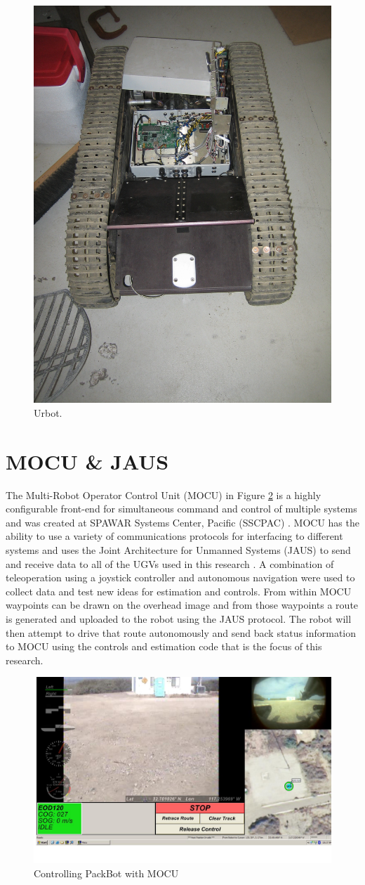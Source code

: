 \begin{figure}[ht!]
	\centering
	\includegraphics[width=.3\textwidth]{images/urbot}
	\caption{Urbot.}
	\label{fig:urbot}
\end{figure}

\section{MOCU \& JAUS}
\label{sec:mocujaus}
The Multi-Robot Operator Control Unit (MOCU) in Figure \ref{fig:mocu} is a highly configurable front-end for simultaneous command and control of multiple systems and was created at SPAWAR Systems Center, Pacific (SSCPAC) \cite{PowellMOCU08}. MOCU has the ability to use a variety of communications protocols for interfacing to different systems and uses the Joint Architecture for Unmanned Systems (JAUS) to send and receive data to all of the UGVs used in this research \cite{RoweJAUS08}. A combination of teleoperation using a joystick controller and autonomous navigation were used to collect data and test new ideas for estimation and controls. From within MOCU waypoints can be drawn on the overhead image and from those waypoints a route is generated and uploaded to the robot using the JAUS protocol. The robot will then attempt to drive that route autonomously and send back status information to MOCU using the controls and estimation code that is the focus of this research.

\begin{figure}[ht!]
	\centering
	\includegraphics[width=.75\textwidth]{images/mocuPackbotScreenshot}
	\caption{Controlling PackBot with MOCU}
	\label{fig:mocu}
\end{figure}

